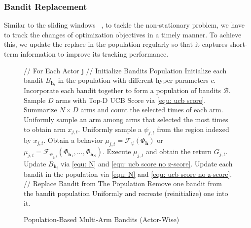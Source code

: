 \subsubsection{Bandit Replacement}
Similar to the sliding windows ~\citep{agent57}, to tackle the  non-stationary  problem, we have to track the changes of optimization objectives in a timely manner. To achieve this, we update the replace in the population regularly so that it captures short-term information to improve its tracking performance. 

\begin{figure}[ht]
  \centering
  \begin{minipage}{.9\linewidth}
    \begin{algorithm}[H]
      \caption{Population-Based Multi-Arm Bandits (Actor-Wise)}  
          \begin{algorithmic}
          \STATE // For Each Actor j
          \STATE // Initialize Bandits Population
            \STATE Initialize each bandit  $B_{\mathbf{h}_i}$ in the population with different hyper-parameters $c$.
                \STATE Incorporate each bandit together to form a population of bandits $\mathcal{B}$.
            \STATE Sample $D$ arms  with Top-D UCB Score via \eqref{equ: ucb score}.
            \ENDFOR
            \STATE Summarize $N\times D$ arms and count the selected times of each arm.
            \STATE Uniformly sample an arm among arms that selected the most times to obtain arm $x_{j,t}$.
            \STATE Uniformly sample a $\psi_{j,t}$ from  the region indexed by $x_{j,t}$.
            \STATE Obtain a behavior $\mu_{j,t} =\mathcal{F}_{\psi} (\Phi_{\mathbf{h}})$ or $\mu_{j,t} =\mathcal{F}_{\psi_{j,t}} (\Phi_{\mathbf{h}_1},...,\Phi_{\mathbf{h}_\mathrm{N}})$.
            \STATE Execute $\mu_{j,t}$ and obtain the return $G_{j,t}$.
            \STATE Update $B_{\mathbf{h}_i}$ via  \eqref{equ: N} and \eqref{equ: ucb score no z-score}.
            \ENDFOR
            \STATE Update each bandit in the population via  \eqref{equ: N} and \eqref{equ: ucb score no z-score}.
            \STATE // Replace Bandit from The Population
            \STATE Remove one bandit from the bandit population Uniformly and recreate (reinitialize) one into it.
            \ENDIF
            \ENDFOR
          \end{algorithmic}  
        \label{alg:bva}
    \end{algorithm}
  \end{minipage}
\end{figure}


